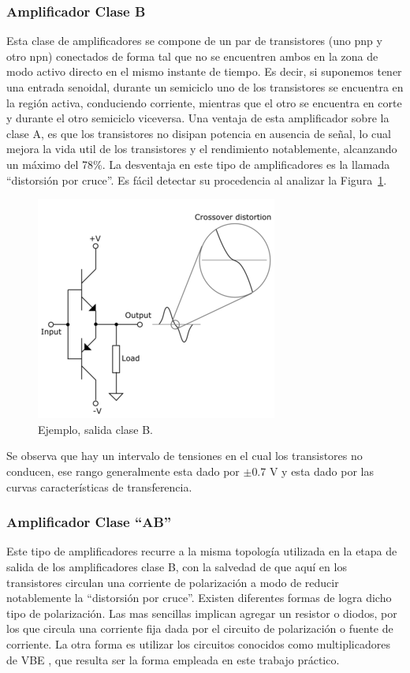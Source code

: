 \medskip 
\subsubsection*{Amplificador Clase B}

Esta clase de amplificadores se compone de un par de transistores (uno pnp y otro npn) conectados de forma tal que no se encuentren ambos en la zona de modo activo directo en el mismo instante de tiempo. Es decir, si suponemos tener una entrada senoidal, durante un semiciclo uno de los transistores se encuentra en la región activa, conduciendo corriente, mientras que el otro se encuentra en corte y durante el otro semiciclo viceversa.
 Una ventaja de esta amplificador sobre la clase A, es que los transistores no disipan potencia en ausencia de señal, lo cual mejora la vida util de los transistores y el rendimiento notablemente, alcanzando un máximo del 78\%.
 La desventaja en este tipo de amplificadores es la llamada “distorsión por cruce”. Es fácil detectar su procedencia al analizar la Figura~\ref{ampliB}.

\begin{figure}[H]
\centering
\includegraphics[scale=0.8]{img/ampliB.png}
\caption{Ejemplo, salida clase B.}
\label{ampliB} 
\end{figure}


Se observa que hay un intervalo de tensiones en el cual los transistores no conducen, ese rango generalmente esta dado por $\pm$0.7 V y esta dado por las curvas características de transferencia.

\medskip 
\subsubsection*{Amplificador Clase “AB”}


 Este tipo de amplificadores recurre a la misma topología utilizada en la etapa de salida de los amplificadores clase B, con la salvedad de que aquí en los transistores circulan una corriente de polarización a modo de reducir notablemente la “distorsión por cruce”.
 Existen diferentes formas de logra dicho tipo de polarización. Las mas sencillas implican agregar un resistor o diodos, por los que circula una corriente fija dada por el circuito de polarización o fuente de corriente. La otra forma es utilizar los circuitos conocidos como multiplicadores de VBE , que resulta ser la forma empleada en este trabajo práctico.

